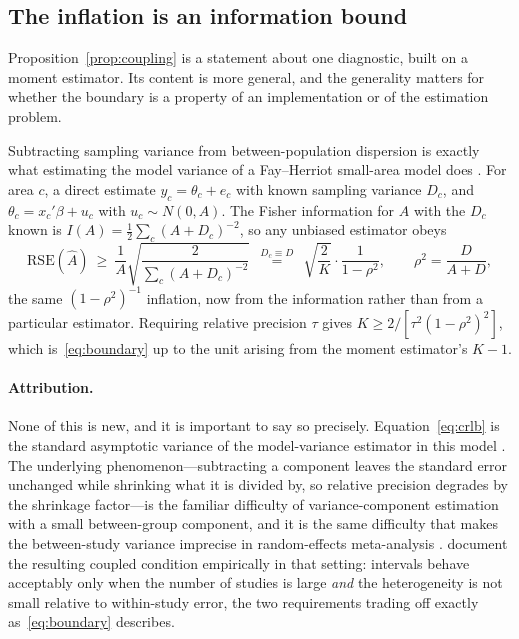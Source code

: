 \subsection{The inflation is an information bound}\label{sec:information}

Proposition~\ref{prop:coupling} is a statement about one diagnostic, built on a
moment estimator. Its content is more general, and the generality matters for
whether the boundary is a property of an implementation or of the estimation
problem.

Subtracting sampling variance from between-population dispersion is exactly
what estimating the model variance of a Fay--Herriot small-area model does
\citep{fay1979estimates,rao2015small}. For area $c$, a direct estimate
$y_c=\theta_c+e_c$ with known sampling variance $D_c$, and
$\theta_c=x_c'\beta+u_c$ with $u_c\sim N(0,A)$. The Fisher information for $A$
with the $D_c$ known is $I(A)=\tfrac12\sum_c(A+D_c)^{-2}$, so any unbiased
estimator obeys
\begin{equation}\label{eq:crlb}
\mathrm{RSE}(\widehat A)\ \ge\ \frac{1}{A}\sqrt{\frac{2}{\sum_c(A+D_c)^{-2}}}
\ \ \overset{D_c\equiv D}{=}\ \ \sqrt{\frac{2}{K}}\cdot\frac{1}{1-\rho^2},
\qquad \rho^2=\frac{D}{A+D},
\end{equation}
the same $(1-\rho^2)^{-1}$ inflation, now from the information rather than from
a particular estimator. Requiring relative precision $\tau$ gives
$K\ge2/[\tau^2(1-\rho^2)^2]$, which is~\eqref{eq:boundary} up to the unit
arising from the moment estimator's $K-1$.

\paragraph{Attribution.} None of this is new, and it is important to say so
precisely. Equation~\eqref{eq:crlb} is the standard asymptotic variance of the
model-variance estimator in this model \citep{rao2015small}. The underlying
phenomenon---subtracting a component leaves the standard error unchanged while
shrinking what it is divided by, so relative precision degrades by the shrinkage
factor---is the familiar difficulty of variance-component estimation with a
small between-group component, and it is the same difficulty that makes the
between-study variance imprecise in random-effects meta-analysis
\citep{dersimonian1986meta}. \citet{partlett2017random} document the resulting
coupled condition empirically in that setting: intervals behave acceptably only
when the number of studies is large \emph{and} the heterogeneity is not
small relative to within-study error, the two requirements trading off exactly
as~\eqref{eq:boundary} describes.

